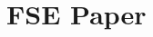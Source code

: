\chapter[FSE Paper]
{FSE Paper}%
\label{ch:fse2020}
\graphicspath{{mainmatter/publications/figures/fse2020/}}

